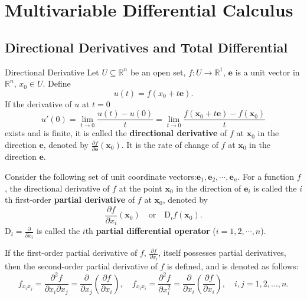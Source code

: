 \documentclass[11pt]{elegantbook}
\begin{document}
\chapter{Multivariable Differential Calculus}
\section{Directional Derivatives and Total Differential}
\begin{definition}{Directional Derivative}
    Let \(U\subseteq \mathbb{R}^n\) be an open set, \(f: U\to \mathbb{R}^{1}\),
    \(\boldsymbol{e}\) is a unit vector in \(\mathbb{R}^{n}\), \(x_{0}\in U\). Define
    \[
    u(t) = f(x_{0} + t\boldsymbol{e}).
    \]
    If the derivative of \(u\) at \(t=0\) 
    \[ 
        u'(0) = \lim_{t \to 0} \frac{u(t) - u(0)}{t} = 
        \lim_{t \to 0} \frac{f(\boldsymbol{x}_{0} + t\boldsymbol{e}) - f(\boldsymbol{x}_{0})}{t} 
    \] 
    exists and is finite, 
    it is called the \textbf{directional derivative} of \(f\) at \(\boldsymbol{x}_{0}\) in the direction \(\boldsymbol{e}\), 
    denoted by \(\frac{\partial f}{\partial \boldsymbol{e}}(\boldsymbol{x}_{0})\). 
    It is the rate of change of \(f\) at \(\boldsymbol{x}_{0}\) in the direction \(\boldsymbol{e}\).
\end{definition}

Consider the following set of unit coordinate vectors:\(\boldsymbol{e}_{1},\boldsymbol{e}_{2},\cdots,\boldsymbol{e}_{n}\).
For a function \( f \), the directional derivative of \( f \) at the point \( \boldsymbol{x}_{0} \) in the direction of \( \boldsymbol{e}_{i} \) 
is called the \( i \)th first-order \textbf{partial derivative} of \( f \) at \(\boldsymbol{x}_{0}\), denoted by
\[
\frac{\partial f}{\partial x_i}(\boldsymbol{x}_{0}) \quad \text{or} \quad \mathrm{D}_i f(\boldsymbol{x}_{0}).
\]
\( \mathrm{D}_i = \frac{\partial}{\partial x_i} \) is called the \( i \)th \textbf{partial differential operator} (\( i = 1, 2, \cdots, n \)).

If the first-order partial derivative of \(f\), \(\frac{\partial f}{\partial x_i}\), 
itself possesses partial derivatives, then the second-order partial derivative of \(f\) is defined, 
and is denoted as follows:
\[
f_{x_i x_j} = \frac{\partial^2 f}{\partial x_i \partial x_j} = \frac{\partial}{\partial x_j} \left( \frac{\partial f}{\partial x_i} \right), 
\quad f_{x_i x_i} = \frac{\partial^2 f}{\partial x_i^2} = \frac{\partial}{\partial x_i} \left( \frac{\partial f}{\partial x_i} \right), 
\quad i, j = 1, 2, \dots, n.
\]
\end{document}
